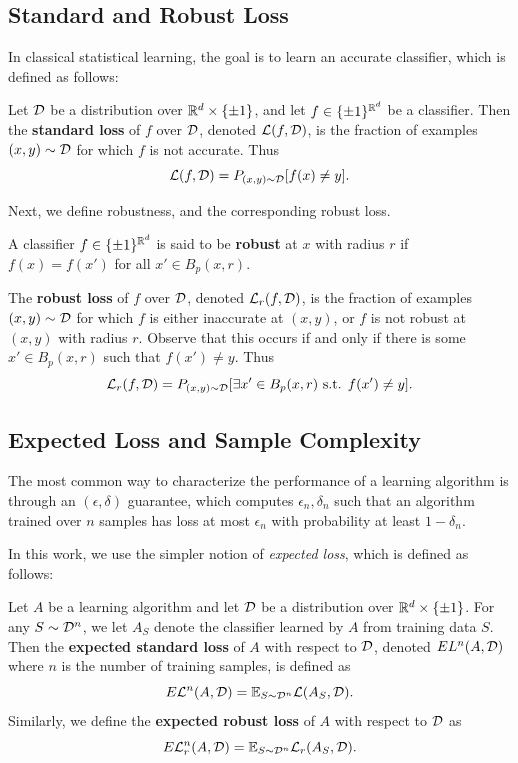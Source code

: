 \subsection{Standard and Robust Loss}

In classical statistical learning, the goal is to learn an accurate classifier, which is defined as follows:

\begin{defn}
Let ${\mathcal D}$ be a distribution over $\mathbb R^d \times \{\pm 1\}$, and let $f \in \{\pm 1\}^{\mathbb R^d}$ be a classifier. Then the \textbf{standard loss} of $f$ over ${\mathcal D}$, denoted $\mathcal L(f, {\mathcal D})$, is the fraction of examples $(x,y) \sim {\mathcal D}$ for which $f$ is not accurate. Thus $$\mathcal L(f, {\mathcal D}) = P_{(x,y) \sim {\mathcal D}}[f(x) \neq y].$$
\end{defn}

Next, we define robustness, and the corresponding robust loss.

\begin{defn}
A classifier $f \in \{\pm 1\}^{\mathbb R^d}$ is said to be \textbf{robust} at $x$ with radius $r$ if $f(x) = f(x')$ for all $x' \in B_p(x,r)$. 
\end{defn}


\begin{defn}
The \textbf{robust loss} of $f$ over ${\mathcal D}$, denoted $\mathcal L_r(f, {\mathcal D})$, is the fraction of examples $(x,y) \sim {\mathcal D}$ for which $f$ is either inaccurate at $(x,y)$, or $f$ is not robust at $(x,y)$ with radius $r$. Observe that this occurs if and only if there is some $x' \in B_p(x,r)$ such that $f(x') \neq y$. Thus $$\mathcal L_r(f, {\mathcal D}) = P_{(x, y) \sim {\mathcal D}}[\exists x' \in B_p(x,r)\text{ s.t. }f(x') \neq y].$$ 
\end{defn}

\subsection{Expected Loss and  Sample Complexity}

The most common way to characterize the performance of a learning algorithm is through an $(\epsilon, \delta)$ guarantee, which computes $\epsilon_n, \delta_n$ such that an algorithm trained over $n$ samples has loss at most $\epsilon_n$ with probability at least $1 - \delta_n$. 

In this work, we use the simpler notion of \textit{expected loss}, which is defined as follows: 

\begin{defn}
Let $A$ be a learning algorithm and let ${\mathcal D}$ be a distribution over $\mathbb R^d \times \{\pm 1\}$. For any $S \sim {\mathcal D}^n$, we let $A_S$ denote the classifier learned by $A$ from training data $S$. Then the \textbf{expected standard loss} of $A$ with respect to ${\mathcal D}$, denoted $EL^n(A, {\mathcal D})$ where $n$ is the number of training samples, is defined as $$E\mathcal L^n(A, {\mathcal D}) = {\mathbb E}_{S \sim {\mathcal D}^n} \mathcal L(A_S, {\mathcal D}).$$ Similarly, we define the \textbf{expected robust loss} of $A$ with respect to ${\mathcal D}$ as $$E\mathcal L_r^n(A , {\mathcal D}) = {\mathbb E}_{S \sim {\mathcal D}^n}\mathcal L_r(A_S, {\mathcal D}).$$ 
\end{defn}

